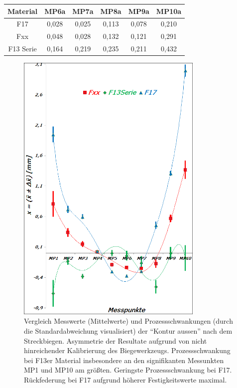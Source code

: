 \documentclass[12pt,a4paper,parskip,twoside,BCOR5mm,headsepline]{scrartcl}
\begin{document}
\begin{table}[hbtp]
\begin{tabular}{cccccc}
  Material    & MP6a & MP7a & MP8a & MP9a & MP10a  \\
  \midrule
    F17 &0,028&0,025&0,113&0,078&0,210\\
 Fxx   &0,048&0,028&0,132&0,121&0,291\\
F13 Serie &0,164&0,219&0,235&0,211&0,432\\ 
   \bottomrule 
         
   \end{tabular} 
\end{table}

\begin{figure}[hbtp] 
\centering
\includegraphics[width=0.8\textwidth]{mitkontausstrckb}
\caption{Vergleich Messwerte (Mittelwerte) und Prozessschwankungen (durch die Standardabweichung visualisiert) der   "`Kontur aussen"' nach dem Streckbiegen. Asymmetrie der Resultate aufgrund von nicht hinreichender Kalibrierung des Biegewerkzeugs. Prozessschwankung  bei F13er Material insbesondere an den signifikanten Messunkten MP1 und MP10 am größten. Geringste Prozessschwankung bei F17. Rückfederung bei F17 aufgrund höherer Festigkeitswerte maximal.}
\label{fig:mitstrckb}
\end{figure}
\end{document}

